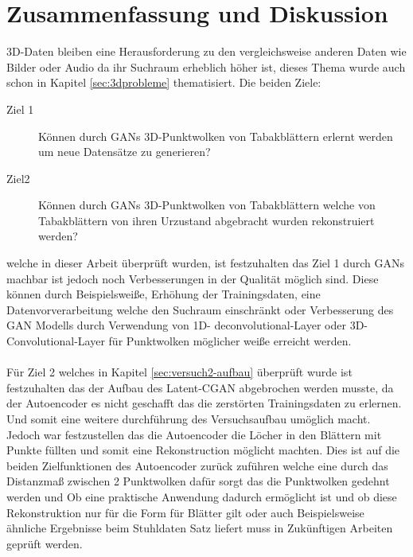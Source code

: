 \documentclass{llncs}
\begin{document}
\section{Zusammenfassung und Diskussion }

3D-Daten bleiben eine Herausforderung zu den vergleichsweise anderen Daten wie Bilder oder Audio da ihr Suchraum erheblich höher ist, dieses Thema wurde auch schon in Kapitel \ref{sec:3dprobleme} thematisiert. Die beiden Ziele:
 
\begin{description}
	\item[Ziel 1]
	Können durch GANs 3D-Punktwolken von Tabakblättern erlernt werden um neue Datensätze zu generieren?\\
	\item[Ziel2]
	Können durch GANs 3D-Punktwolken von Tabakblättern welche von Tabakblättern von ihren Urzustand abgebracht wurden rekonstruiert werden? 
\end{description}


welche in dieser Arbeit überprüft wurden, ist festzuhalten das Ziel 1 durch GANs machbar ist jedoch noch Verbesserungen in der Qualität möglich sind. Diese können durch Beispielsweiße, Erhöhung der Trainingsdaten, eine Datenvorverarbeitung welche den Suchraum einschränkt oder Verbesserung des GAN Modells durch Verwendung von 1D- deconvolutional-Layer oder 3D-Convolutional-Layer für Punktwolken \cite{3d-conv} möglicher weiße erreicht werden. 
\\\\
Für Ziel 2 welches in Kapitel \ref{sec:versuch2-aufbau} überprüft wurde ist festzuhalten das der Aufbau des Latent-CGAN abgebrochen werden musste, da der Autoencoder es nicht geschafft das die zerstörten Trainingsdaten zu erlernen. Und somit eine weitere durchführung des Versuchsaufbau umöglich macht. Jedoch war festzustellen das die Autoencoder die Löcher in den Blättern mit Punkte füllten und somit eine Rekonstruction möglicht machten. Dies ist auf die beiden Zielfunktionen des Autoencoder zurück zuführen welche eine durch das Distanzmaß zwischen 2 Punktwolken dafür sorgt das die Punktwolken gedehnt werden und  Ob eine praktische Anwendung dadurch ermöglicht ist und ob diese Rekonstruktion nur für die Form für Blätter gilt oder auch Beispielsweise ähnliche Ergebnisse beim Stuhldaten Satz liefert muss in Zukünftigen Arbeiten geprüft werden. 
\end{document}
